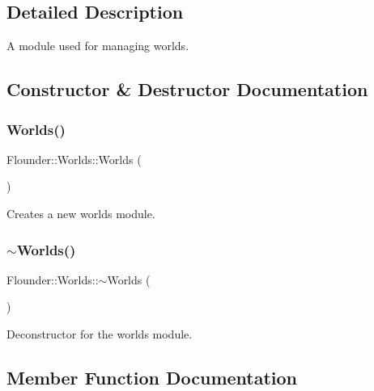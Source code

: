 \subsection{Detailed Description}
A module used for managing worlds. 



\subsection{Constructor \& Destructor Documentation}
\mbox{\label{class_flounder_1_1_worlds_a3cd4af77cc7845c4cc33090a247a5a11}} 
\subsubsection{\texorpdfstring{Worlds()}{Worlds()}}
{\footnotesize\ttfamily Flounder\+::\+Worlds\+::\+Worlds (\begin{DoxyParamCaption}{ }\end{DoxyParamCaption})}



Creates a new worlds module. 

\mbox{\label{class_flounder_1_1_worlds_a9d4dc057202a37e2d49e2a839687dcfd}} 
\subsubsection{\texorpdfstring{$\sim$\+Worlds()}{~Worlds()}}
{\footnotesize\ttfamily Flounder\+::\+Worlds\+::$\sim$\+Worlds (\begin{DoxyParamCaption}{ }\end{DoxyParamCaption})}



Deconstructor for the worlds module. 



\subsection{Member Function Documentation}
\mbox{\label{class_flounder_1_1_worlds_a389722b93c5d636192a335dccbb8f4b3}} 
